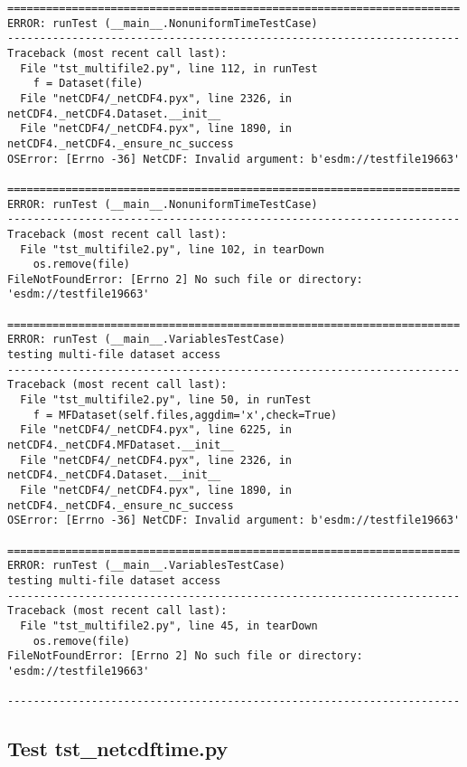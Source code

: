 \begin{verbatim}
======================================================================
ERROR: runTest (__main__.NonuniformTimeTestCase)
----------------------------------------------------------------------
Traceback (most recent call last):
  File "tst_multifile2.py", line 112, in runTest
    f = Dataset(file)
  File "netCDF4/_netCDF4.pyx", line 2326, in netCDF4._netCDF4.Dataset.__init__
  File "netCDF4/_netCDF4.pyx", line 1890, in netCDF4._netCDF4._ensure_nc_success
OSError: [Errno -36] NetCDF: Invalid argument: b'esdm://testfile19663'

======================================================================
ERROR: runTest (__main__.NonuniformTimeTestCase)
----------------------------------------------------------------------
Traceback (most recent call last):
  File "tst_multifile2.py", line 102, in tearDown
    os.remove(file)
FileNotFoundError: [Errno 2] No such file or directory: 'esdm://testfile19663'

======================================================================
ERROR: runTest (__main__.VariablesTestCase)
testing multi-file dataset access
----------------------------------------------------------------------
Traceback (most recent call last):
  File "tst_multifile2.py", line 50, in runTest
    f = MFDataset(self.files,aggdim='x',check=True)
  File "netCDF4/_netCDF4.pyx", line 6225, in netCDF4._netCDF4.MFDataset.__init__
  File "netCDF4/_netCDF4.pyx", line 2326, in netCDF4._netCDF4.Dataset.__init__
  File "netCDF4/_netCDF4.pyx", line 1890, in netCDF4._netCDF4._ensure_nc_success
OSError: [Errno -36] NetCDF: Invalid argument: b'esdm://testfile19663'

======================================================================
ERROR: runTest (__main__.VariablesTestCase)
testing multi-file dataset access
----------------------------------------------------------------------
Traceback (most recent call last):
  File "tst_multifile2.py", line 45, in tearDown
    os.remove(file)
FileNotFoundError: [Errno 2] No such file or directory: 'esdm://testfile19663'

----------------------------------------------------------------------
\end{verbatim}

\subsection{Test tst\_netcdftime.py}

